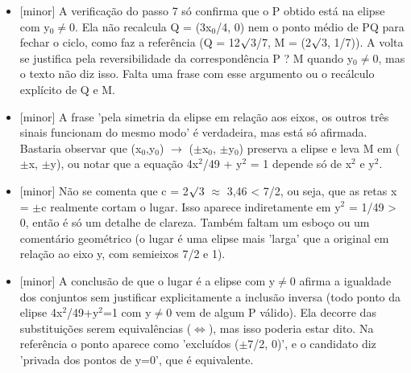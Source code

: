 \documentclass{article}%
\begin{document}
\begin{itemize}%
\item%
{[}minor{]} A verificação do passo 7 só confirma que o P obtido está na elipse com y$_{0}$$\neq$0. Ela não recalcula Q = (3x$_{0}$/4, 0) nem o ponto médio de PQ para fechar o ciclo, como faz a referência (Q = 12$\surd$3/7, M = (2$\surd$3, 1/7)). A volta se justifica pela reversibilidade da correspondência P ? M quando y$_{0}$$\neq$0, mas o texto não diz isso. Falta uma frase com esse argumento ou o recálculo explícito de Q e M.%
\item%
{[}minor{]} A frase 'pela simetria da elipse em relação aos eixos, os outros três sinais funcionam do mesmo modo' é verdadeira, mas está só afirmada. Bastaria observar que (x$_{0}$,y$_{0}$) $\to$ ($\pm$x$_{0}$, $\pm$y$_{0}$) preserva a elipse e leva M em ($\pm$x, $\pm$y), ou notar que a equação 4x$^2$/49 + y$^2$ = 1 depende só de x$^2$ e y$^2$.%
\item%
{[}minor{]} Não se comenta que c = 2$\surd$3 $\approx$ 3,46 < 7/2, ou seja, que as retas x = $\pm$c realmente cortam o lugar. Isso aparece indiretamente em y$^2$ = 1/49 > 0, então é só um detalhe de clareza. Também faltam um esboço ou um comentário geométrico (o lugar é uma elipse mais 'larga' que a original em relação ao eixo y, com semieixos 7/2 e 1).%
\item%
{[}minor{]} A conclusão de que o lugar é a elipse com y$\neq$0 afirma a igualdade dos conjuntos sem justificar explicitamente a inclusão inversa (todo ponto da elipse 4x$^2$/49+y$^2$=1 com y$\neq$0 vem de algum P válido). Ela decorre das substituições serem equivalências ($\Leftrightarrow$), mas isso poderia estar dito. Na referência o ponto aparece como 'excluídos ($\pm$7/2, 0)', e o candidato diz 'privada dos pontos de y=0', que é equivalente.%
\end{itemize}%
\end{document}
